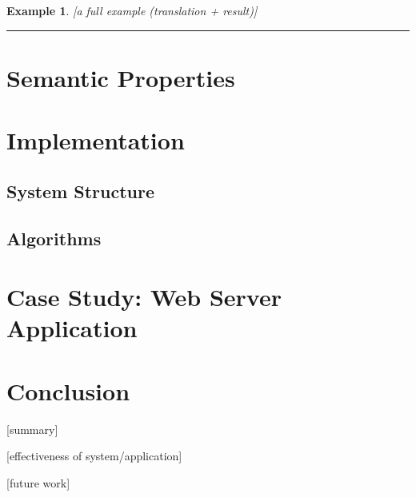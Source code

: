 \documentclass[10pt, twocolumn]{article}
\newtheorem{examp}{Example}
\newenvironment{example}{\begin{examp}\rm}{\rule{2mm}{2mm}\end{examp}}
\begin{document}
    \begin{example}
      [a full example (translation + result)]

    \end{example}

  \section{Semantic Properties}

  \section{Implementation}

    \subsection{System Structure}

    \subsection{Algorithms}

  \section{Case Study: Web Server Application}

  \section{Conclusion}

    [summary]

    [effectiveness of system/application]

    [future work]
\end{document}
